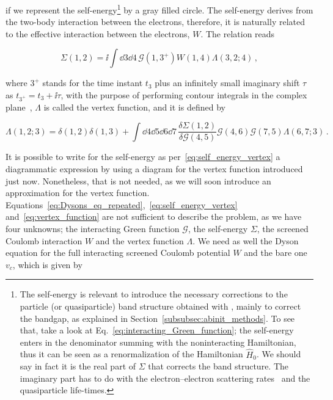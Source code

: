 \noindent if we represent the self-energy\footnote{The self-energy is relevant to introduce the necessary corrections to the particle (or quasiparticle) band structure obtained with \dft, mainly to correct the bandgap, as explained in Section~\ref{subsubsec:abinit_methods}. To see that, take a look at Eq.~\ref{eq:interacting_Green_function}; the self-energy enters in the denominator summing with the noninteracting Hamiltonian, thus it can be seen as a renormalization of the Hamiltonian $\hat{H}_0$. We should say in fact it is the real part of $\Sigma$ that corrects the band structure. The imaginary part has to do with the electron--electron scattering rates~\cite{Bruus_Flensberg_2004} and the quasiparticle life-times.} by a gray filled circle.
The self-energy derives from the two-body interaction between the electrons, therefore, it is naturally related to the effective interaction between the electrons, $W$.
The relation reads

\begin{equation}
    \label{eq:self_energy_vertex}
    \Sigma(1,2) = \ii \int \dd{3} \dd{4}\, \mathcal{G}(1,3^{+}) W(1,4) \Lambda(3,2;4)  \,,
\end{equation}

\noindent where $3^{+}$ stands for the time instant $t_3$ plus an infinitely small imaginary shift $\tau$ as $t_{3^{+}} = t_3 + \ii \tau$, with the purpose of performing contour integrals in the complex plane~\cite{Bruus_Flensberg_2004,Mahan}, $\Lambda$ is called the vertex function, and it is defined by

\begin{equation}
    \label{eq:vertex_function}
    \Lambda(1,2;3) = \delta(1,2) \delta(1,3) + \int \dd{4} \dd{5} \dd{6} \dd{7} \, \frac{\delta \Sigma(1,2)}{\delta \mathcal{G}(4,5)} \mathcal{G}(4,6) \mathcal{G}(7,5)  \Lambda(6,7;3) \,.
\end{equation}

\noindent It is possible to write for the self-energy as per~\eqref{eq:self_energy_vertex} a diagrammatic expression by using a diagram for the vertex function introduced just now.
Nonetheless, that is not needed, as we will soon introduce an approximation for the vertex function.
Equations~\eqref{eq:Dysons_eq_repeated},~\eqref{eq:self_energy_vertex} and~\eqref{eq:vertex_function} are not sufficient to describe the problem, as we have four unknowns; the interacting Green function $\mathcal{G}$, the self-energy $\Sigma$, the screened Coulomb interaction $W$ and the vertex function $\Lambda$.
We need as well the Dyson equation for the full interacting screened Coulomb potential $W$ and the bare one $v_c$, which is given by

